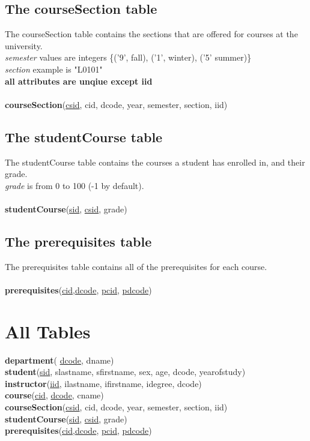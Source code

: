 \documentclass[11pt]{article}
\begin{document}
\subsection{The courseSection table}
The courseSection table contains the sections that are offered for courses at the university.\\
\textit{semester} values are integers \{('9', fall), ('1', winter), ('5' summer)\}\\
\textit{section} example is "L0101"\\
\textbf{all attributes are unqiue except iid}\\
~\\
\textbf{courseSection}(\underline{csid}, cid, dcode, year, semester, section, iid)

\subsection{The studentCourse table}
The studentCourse table contains the courses a student has enrolled in, and their grade.\\
\textit{grade} is from 0 to 100 (-1 by default).\\
~\\
\textbf{studentCourse}(\underline{sid}, \underline{csid}, grade)

\subsection{The prerequisites table}
The prerequisites table contains all of the prerequisites for each course.\\
~\\
\textbf{prerequisites}(\underline{cid},\underline{dcode}, \underline{pcid}, \underline{pdcode})

\section{All Tables}
\textbf{department}( \underline{dcode}, dname)\\
\textbf{student}(\underline{sid}, slastname, sfirstname, sex, age, dcode, yearofstudy)\\
\textbf{instructor}(\underline{iid}, ilastname, ifirstname, idegree, dcode)\\
\textbf{course}(\underline{cid}, \underline{dcode},	cname)\\
\textbf{courseSection}(\underline{csid}, cid, dcode, year, semester, section, iid)\\
\textbf{studentCourse}(\underline{sid}, \underline{csid}, grade)\\
\textbf{prerequisites}(\underline{cid},\underline{dcode}, \underline{pcid}, \underline{pdcode})
\end{document}
